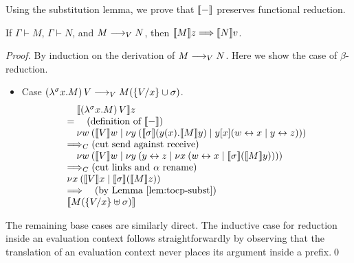 \documentclass[oribibl,orivec,envcountsame]{llncs}
\begin{document}

Using the substitution lemma, we prove that $\tocp -$ preserves functional reduction.
%
\begin{theorem}
\label{thm:teval-preserved}
If $\Gamma \vdash M$, $\Gamma \vdash N$, and $M \teval N$, then $\tocp{M}z
\bigrto \tocp{N}v$.
\end{theorem}
%
\begin{proof}
By induction on the derivation of $M \teval N$. Here we show the case of $\beta$-reduction.
\begin{itemize}
\item Case $(\lambda^\sigma x.M)\,V \teval M(\{\bind x V\} \cup \sigma)$.
\[
\bl
\quad \tocp{(\lambda^\sigma x.M)\,V}z \\
= \quad (\text{definition of }\tocp{-}) \\
\quad \cut{w}{}{\tocp{V}w}{\cut{y}{}{\tocp{\sigma}(y(x).\tocp{M}y)}{y[x](\link{w}{x} \mid \link{y}{z})}} \\
\bigcrto (\text{cut send against receive}) \\
\quad \cut{w}{}{\tocp{V}w}{\cut{y}{}{\link{y}{z}}{\cut{x}{}{\link{w}{x}}{\tocp{\sigma}(\tocp{M}y)}}} \\
\bigcrto (\text{cut links and $\alpha$ rename}) \\
\cut{x}{}{\tocp{V}x}{\tocp{\sigma}(\tocp{M}z)} \\
\bigrto \quad (\text{by \lemref{tocp-subst}}) \\
\tocp{M(\{\bind x V\} \uplus \sigma)}
\el
\]
\end{itemize}
The remaining base cases are similarly direct. The inductive case for reduction inside an evaluation
context follows straightforwardly by observing that the translation of an evaluation context never
places its argument inside a prefix.\qed
\end{proof}
\end{document}
